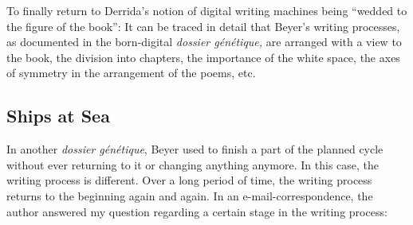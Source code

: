 \documentclass{article}
\begin{document}
To finally return to Derrida's notion of digital writing machines being
``wedded to the figure of the book'': It can be traced in detail that
Beyer's writing processes, as documented in the born-digital
\emph{dossier génétique,} are arranged with a view to the book, the
division into chapters, the importance of the white space, the axes of
symmetry in the arrangement of the poems, etc.

\subsection*{Ships at Sea}

In another \emph{dossier génétique}, Beyer used to finish a part of the
planned cycle without ever returning to it or changing anything
anymore. In this case, the writing process is different. Over a long
period of time, the writing process returns to the beginning again and
again. In an e-mail-correspondence, the author answered my question
regarding a certain stage in the writing process:
\end{document}
